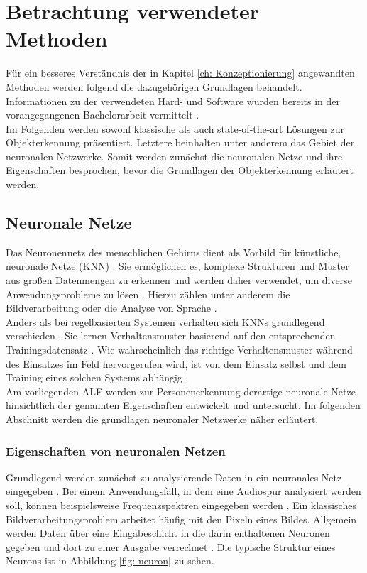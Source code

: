 \chapter{Betrachtung verwendeter Methoden}
\label{ch: Grundlagen}
	Für ein besseres Verständnis der in Kapitel \ref{ch: Konzeptionierung} angewandten Methoden werden folgend die dazugehörigen Grundlagen behandelt. Informationen zu der verwendeten Hard- und Software wurden bereits in der vorangegangenen Bachelorarbeit vermittelt \cite{Bachelorarbeit}.\\
	
	Im Folgenden werden sowohl klassische als auch state-of-the-art Lösungen zur Objekterkennung präsentiert. Letztere beinhalten unter anderem das Gebiet der neuronalen Netzwerke. Somit werden zunächst die neuronalen Netze und ihre Eigenschaften besprochen, bevor die Grundlagen der Objekterkennung erläutert werden. 
 
	
 	\section{Neuronale Netze}
	\label{sec: ROS}
	
	Das Neuronennetz des menschlichen Gehirns dient als Vorbild für künstliche, neuronale Netze (KNN) \cite{neuronennetz}. Sie ermöglichen es, komplexe Strukturen und Muster aus großen Datenmengen zu erkennen und werden daher verwendet, um diverse Anwendungsprobleme zu lösen \cite{neuronennetz}. Hierzu zählen unter anderem die Bildverarbeitung oder die Analyse von Sprache \cite{sinn}.\\
	
	Anders als bei regelbasierten Systemen verhalten sich KNNs grundlegend verschieden \cite{proba}. Sie lernen Verhaltensmuster basierend auf den entsprechenden Trainingsdatensatz \cite{proba}. Wie wahrscheinlich das richtige Verhaltensmuster während des Einsatzes im Feld hervorgerufen wird, ist von dem Einsatz selbst und dem Training eines solchen Systems abhängig \cite{last}.\\
	
	Am vorliegenden ALF werden zur Personenerkennung derartige neuronale Netze hinsichtlich der genannten Eigenschaften entwickelt und untersucht. Im folgenden Abschnitt werden die grundlagen neuronaler Netzwerke näher erläutert.
	
		\subsection{Eigenschaften von neuronalen Netzen}
		\label{subsec: Eigenschaften von neuronalen Netzen}
		Grundlegend werden zunächst zu analysierende Daten in ein neuronales Netz eingegeben \cite{Kriesel}. Bei einem Anwendungsfall, in dem eine Audiospur analysiert werden soll, können beispielsweise Frequenzspektren eingegeben werden \cite{Dittmann}. Ein klassisches Bildverarbeitungsproblem arbeitet häufig mit den Pixeln eines Bildes. Allgemein werden Daten über eine Eingabeschicht in die darin enthaltenen Neuronen gegeben und dort zu einer Ausgabe verrechnet \cite{Kriesel}. Die typische Struktur eines Neurons ist in Abbildung \ref{fig: neuron} zu sehen. \\
		
